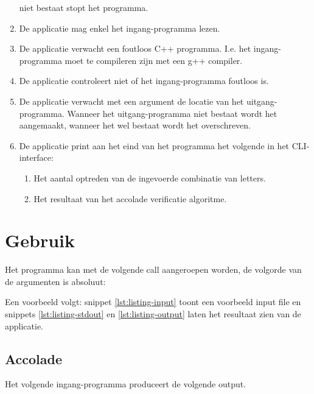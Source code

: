 \documentclass[10pt]{article}
\begin{document}
\begin{enumerate}
            niet bestaat stopt het programma.
      \item De applicatie mag enkel het ingang-programma lezen.
      \item De applicatie verwacht een foutloos C++ programma. I.e. het ingang-programma moet te compileren zijn met
            een
            g++ compiler.
      \item De applicatie controleert niet of het ingang-programma foutloos is.
      \item De applicatie verwacht met een argument de locatie van het uitgang-programma. Wanneer het uitgang-programma
            niet bestaat wordt het aangemaakt, wanneer het wel bestaat wordt het overschreven.
      \item De applicatie print aan het eind van het programma het volgende in het CLI-interface:
            \begin{enumerate}
                  \item Het aantal optreden van de ingevoerde combinatie van letters.
                  \item Het resultaat van het accolade verificatie algoritme.
            \end{enumerate}
\end{enumerate}

\section{Gebruik}
Het programma kan met de volgende call aangeroepen worden, de volgorde van de argumenten is absoluut:


Een voorbeeld volgt: snippet \ref{lst:listing-input} toont een voorbeeld input file en snippets \ref{lst:listing-stdout} en \ref{lst:listing-output} laten het resultaat zien van de applicatie.





\subsection{Accolade}
Het volgende ingang-programma produceert de volgende output.


\end{document}
